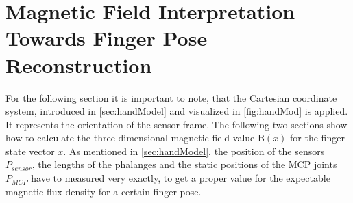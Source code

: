 \section{Magnetic Field Interpretation Towards Finger Pose Reconstruction} \label{sec:magmodel}

For the following section it is important to note, that the Cartesian coordinate system, introduced in \ref{sec:handModel} and visualized in \ref{fig:handMod} is applied. It represents the orientation of the sensor frame. The following two sections show how to calculate the three dimensional magnetic field value $ \mathrm{B}(x) $ for the finger state vector $ x $. As mentioned in \ref{sec:handModel}, the position of the sensors $ P_{sensor} $, the lengths of the phalanges and the static positions of the \ac{MCP} joints $ P_{MCP} $ have to measured very exactly, to get a proper value for the expectable magnetic flux density for a certain finger pose. 

